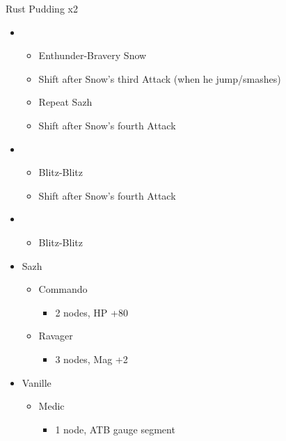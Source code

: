 \begin{multicols}{2}
\begin{battle}{Rust Pudding x2}
\begin{itemize}
    \item \fifth
    \begin{itemize}
        \item Enthunder-Bravery Snow
        \item Shift after Snow's third Attack (when he jump/smashes)
    \end{itemize}
    \third
    \begin{itemize}
        \item Repeat Sazh
        \item Shift after Snow's fourth Attack
    \end{itemize}
    \item \second
    \begin{itemize}
        \item Blitz-Blitz
        \item Shift after Snow's fourth Attack
    \end{itemize}
    \item \sixth
    \begin{itemize}
        \item Blitz-Blitz
    \end{itemize}
\end{itemize}
\end{battle}
\begin{menu}
\begin{itemize}
    \crystarium
    \begin{itemize}
        \item Sazh
        \begin{itemize}
            \item Commando
            \begin{itemize}
                \item 2 nodes, HP +80
            \end{itemize}
            \item Ravager
            \begin{itemize}
                \item 3 nodes, Mag +2
            \end{itemize}
        \end{itemize}
        \item Vanille
        \begin{itemize}
            \item Medic
            \begin{itemize}
                \item 1 node, ATB gauge segment
            \end{itemize}
        \end{itemize}
    \end{itemize}
\end{itemize}
\end{menu}
\end{multicols}
